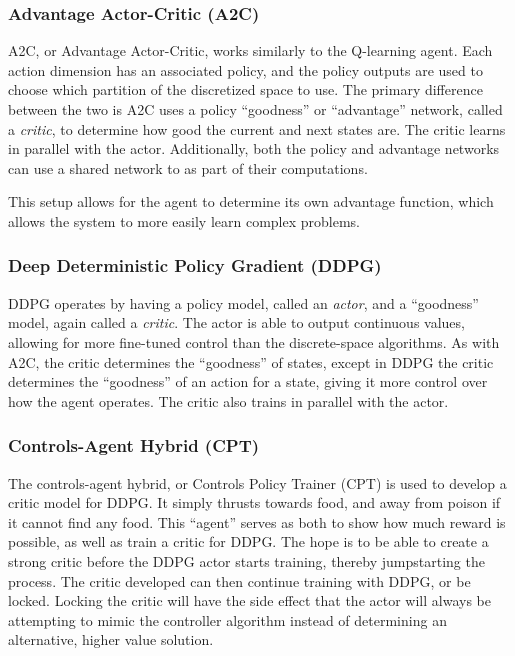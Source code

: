 \subsubsection{Advantage Actor-Critic (A2C)}
A2C, or Advantage Actor-Critic, works similarly to the Q-learning agent.
Each action dimension has an associated policy, and the policy outputs are used to
choose which partition of the discretized space to use.
The primary difference between the two is A2C uses a policy ``goodness'' or
``advantage'' network, called a \textit{critic}, to determine how good the current
and next states are.
The critic learns in parallel with the actor.
Additionally, both the policy and advantage networks can use a shared network to as
part of their computations.

This setup allows for the agent to determine its own advantage function, which
allows the system to more easily learn complex problems.

\subsubsection{Deep Deterministic Policy Gradient (DDPG)}
DDPG operates by having a policy model, called an \textit{actor}, and a ``goodness''
model, again called a \textit{critic}.
The actor is able to output continuous values, allowing for more fine-tuned control
than the discrete-space algorithms.
As with A2C, the critic determines the ``goodness'' of states, except in DDPG the
critic determines the ``goodness'' of an action for a state, giving it more control
over how the agent operates.
The critic also trains in parallel with the actor.

\subsubsection{Controls-Agent Hybrid (CPT)}\label{subsubsec:cpt}
The controls-agent hybrid, or Controls Policy Trainer (CPT) is used to develop a critic
model for DDPG\@.
It simply thrusts towards food, and away from poison if it cannot find any food.
This ``agent'' serves as both to show how much reward is possible, as well as train a
critic for DDPG\@.
The hope is to be able to create a strong critic before the DDPG actor starts
training, thereby jumpstarting the process.
The critic developed can then continue training with DDPG, or be locked.
Locking the critic will have the side effect that the actor will always be attempting
to mimic the controller algorithm instead of determining an alternative, higher value
solution.

